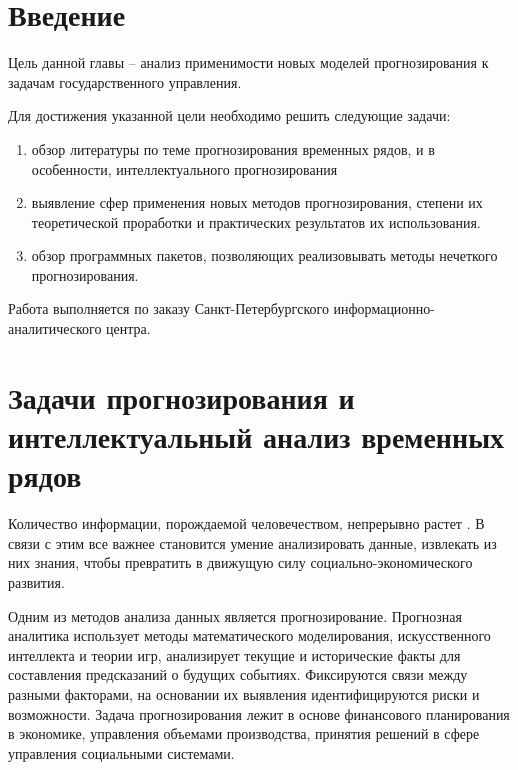 \newpage
\section*{Введение}

Цель данной главы – анализ применимости новых моделей прогнозирования к задачам государственного управления.

Для достижения указанной цели необходимо решить следующие задачи:
\begin{enumerate}
    \item обзор литературы по теме прогнозирования временных рядов, и в особенности, интеллектуального прогнозирования
    \item выявление сфер применения новых методов прогнозирования, степени их теоретической проработки и практических результатов их использования.    
    \item обзор программных пакетов, позволяющих реализовывать методы нечеткого прогнозирования.
\end{enumerate}
Работа выполняется по заказу Санкт-Петербургского информационно-аналитического центра.

\newpage
\section{Задачи прогнозирования и интеллектуальный анализ временных рядов}

Количество информации, порождаемой человечеством, непрерывно растет \cite{Gantz2011}. 
В связи с этим все важнее становится умение анализировать данные, извлекать из них знания, чтобы превратить в движущую силу социально-экономического развития. 

Одним из методов анализа данных является прогнозирование. 
Прогнозная аналитика использует методы математического моделирования, искусственного интеллекта и теории игр, 
анализирует текущие и исторические факты для составления предсказаний о будущих событиях. 
Фиксируются связи между разными факторами, на основании их выявления идентифицируются риски и возможности. 
Задача прогнозирования лежит в основе финансового планирования в экономике, управления объемами производства, принятия решений в сфере управления социальными системами.

